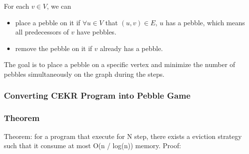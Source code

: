For each $v\in V$, we can
\begin{itemize}
    \item place a pebble on it if $\forall u\in V$ that $(u, v)\in E$, $u$ has a pebble, which means all predecessors of $v$ have pebbles.
    \item remove the pebble on it if $v$ already has a pebble.
\end{itemize}

The goal is to place a pebble on a specific vertex and minimize the number of pebbles simultaneously on the graph during the steps.
\subsubsection{Converting CEKR Program into Pebble Game}
\subsubsection{Theorem}
Theorem: for a program that execute for N step, there exists a eviction strategy such that it consume at most O(n / log(n)) memory.
Proof: 